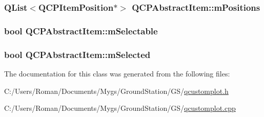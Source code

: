 \subsubsection[{m\+Positions}]{\setlength{\rightskip}{0pt plus 5cm}Q\+List$<${\bf Q\+C\+P\+Item\+Position}$\ast$$>$ Q\+C\+P\+Abstract\+Item\+::m\+Positions\hspace{0.3cm}{\ttfamily [protected]}}\label{class_q_c_p_abstract_item_af94ff71b6a15ea6d028ab8bd8eccd012}
\hypertarget{class_q_c_p_abstract_item_ad81eb35c8726a0f458db9df9732e0e41}{}
\subsubsection[{m\+Selectable}]{\setlength{\rightskip}{0pt plus 5cm}bool Q\+C\+P\+Abstract\+Item\+::m\+Selectable\hspace{0.3cm}{\ttfamily [protected]}}\label{class_q_c_p_abstract_item_ad81eb35c8726a0f458db9df9732e0e41}
\hypertarget{class_q_c_p_abstract_item_a4bdb3457dad1d268c0f78a44152b9645}{}
\subsubsection[{m\+Selected}]{\setlength{\rightskip}{0pt plus 5cm}bool Q\+C\+P\+Abstract\+Item\+::m\+Selected\hspace{0.3cm}{\ttfamily [protected]}}\label{class_q_c_p_abstract_item_a4bdb3457dad1d268c0f78a44152b9645}


The documentation for this class was generated from the following files\+:\begin{DoxyCompactItemize}
\item 
C\+:/\+Users/\+Roman/\+Documents/\+Mygs/\+Ground\+Station/\+G\+S/\hyperlink{qcustomplot_8h}{qcustomplot.\+h}\item 
C\+:/\+Users/\+Roman/\+Documents/\+Mygs/\+Ground\+Station/\+G\+S/\hyperlink{qcustomplot_8cpp}{qcustomplot.\+cpp}\end{DoxyCompactItemize}
